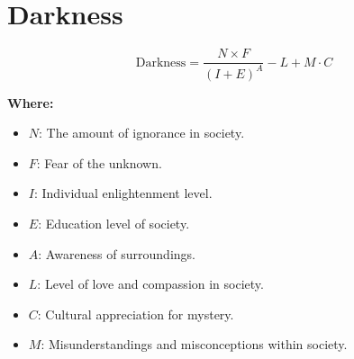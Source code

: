 \chapter{Darkness}

\begin{equation}
\text{Darkness} = \frac{N \times F}{(I + E)^{A}} - L + M \cdot C
\end{equation}

\textbf{Where:}

\begin{itemize}
    \item $N$: The amount of ignorance in society.
    \item $F$: Fear of the unknown.
    \item $I$: Individual enlightenment level.
    \item $E$: Education level of society.
    \item $A$: Awareness of surroundings.
    \item $L$: Level of love and compassion in society.
    \item $C$: Cultural appreciation for mystery.
    \item $M$: Misunderstandings and misconceptions within society.
\end{itemize}